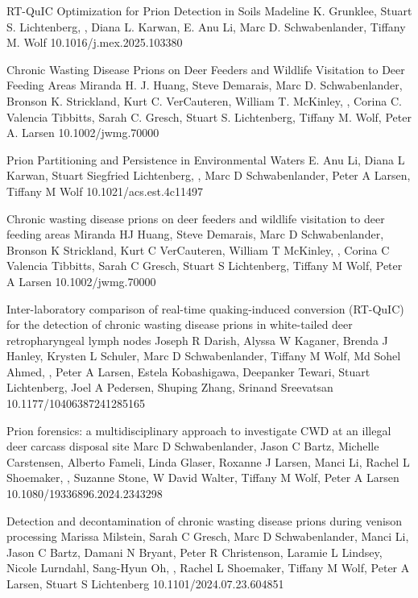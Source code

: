 \documentclass{resume}
\begin{document}
        \begin{samepage}
            {RT-QuIC Optimization for Prion Detection in Soils}
            {Madeline K. Grunklee, Stuart S. Lichtenberg, \me, Diana L. Karwan, E. Anu Li, Marc D. Schwabenlander, Tiffany M. Wolf}
            {10.1016/j.mex.2025.103380}

            {Chronic Wasting Disease Prions on Deer Feeders and Wildlife Visitation to Deer Feeding Areas}
            {Miranda H. J. Huang, Steve Demarais, Marc D. Schwabenlander, Bronson K. Strickland, Kurt C. VerCauteren, William T. McKinley, \me, Corina C. Valencia Tibbitts, Sarah C. Gresch, Stuart S. Lichtenberg, Tiffany M. Wolf, Peter A. Larsen}
            {10.1002/jwmg.70000}

            {Prion Partitioning and Persistence in Environmental Waters}
            {E. Anu Li, Diana L Karwan, Stuart Siegfried Lichtenberg, \me, Marc D Schwabenlander, Peter A Larsen, Tiffany M Wolf}
            {10.1021/acs.est.4c11497}

            {Chronic wasting disease prions on deer feeders and wildlife visitation to deer feeding areas}
            {Miranda HJ Huang, Steve Demarais, Marc D Schwabenlander, Bronson K Strickland, Kurt C VerCauteren, William T McKinley, \me, Corina C Valencia Tibbitts, Sarah C Gresch, Stuart S Lichtenberg, Tiffany M Wolf, Peter A Larsen}
            {10.1002/jwmg.70000}

            {Inter-laboratory comparison of real-time quaking-induced conversion (RT-QuIC) for the detection of chronic wasting disease prions in white-tailed deer retropharyngeal lymph nodes}
            {Joseph R Darish, Alyssa W Kaganer, Brenda J Hanley, Krysten L Schuler, Marc D Schwabenlander, Tiffany M Wolf, Md Sohel Ahmed, \me, Peter A Larsen, Estela Kobashigawa, Deepanker Tewari, Stuart Lichtenberg, Joel A Pedersen, Shuping Zhang, Srinand Sreevatsan}
            {10.1177/10406387241285165}

            {Prion forensics: a multidisciplinary approach to investigate CWD at an illegal deer carcass disposal site}
            {Marc D Schwabenlander, Jason C Bartz, Michelle Carstensen, Alberto Fameli, Linda Glaser, Roxanne J Larsen, Manci Li, Rachel L Shoemaker, \me, Suzanne Stone, W David Walter, Tiffany M Wolf, Peter A Larsen}
            {10.1080/19336896.2024.2343298}

            {Detection and decontamination of chronic wasting disease prions during venison processing}
            {Marissa Milstein, Sarah C Gresch, Marc D Schwabenlander, Manci Li, Jason C Bartz, Damani N Bryant, Peter R Christenson, Laramie L Lindsey, Nicole Lurndahl, Sang-Hyun Oh, \me, Rachel L Shoemaker, Tiffany M Wolf, Peter A Larsen, Stuart S Lichtenberg}
            {10.1101/2024.07.23.604851}


\end{samepage}
\end{document}
